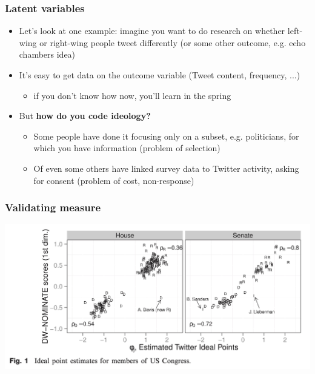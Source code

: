 \documentclass[aspectratio=43]{beamer}
\begin{document}
\begin{frame}
\frametitle{Latent variables}
\centering

\begin{itemize}
  \item Let's look at one example: imagine you want to do research on whether left-wing or right-wing people tweet differently (or some other outcome, e.g. echo chambers idea)
  \item It's easy to get data on the outcome variable (Tweet content, frequency, ...)
  \begin{itemize}
    \item if you don't know how now, you'll learn in the spring
  \end{itemize}
  \item But \textbf{how do you code ideology?}
  \begin{itemize}
    \item<2-> Some people have done it focusing only on a subset, e.g. politicians, for which you have information (problem of selection)
    \item<3-> Of even some others have linked survey data to Twitter activity, asking for consent (problem of cost, non-response)
  \end{itemize}
\end{itemize}

\end{frame}



\begin{frame}
\frametitle{Validating measure}
\centering

\includegraphics[width = \textwidth]{../img/barbera_tw3}

\end{frame}
\end{document}
